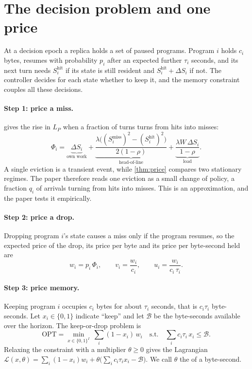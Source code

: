 \section{The decision problem and one price}\label{L5:sec:decision}

At a decision epoch a replica holds a set of paused programs. Program
$i$ holds $c_i$ bytes, resumes with probability $p_i$ after an expected
further $\tau_i$ seconds, and its next turn needs $S_i^{\mathrm{hit}}$ if
its state is still resident and $S_i^{\mathrm{hit}}+\Delta S_i$ if not. The
controller decides for each state whether to keep it, and the memory
constraint couples all these decisions.

\paragraph{Step 1: price a miss.}  gives the rise in $L_P$
when a fraction of turns turns from hits into misses:
\[
  \Phi_i=\underbrace{\Delta S_i}_{\text{own work}}
  +\underbrace{\frac{\lambda\bigl((S_i^{\mathrm{miss}})^2-(S_i^{\mathrm{hit}})^2\bigr)}{2(1-\rho)}}_{\text{head-of-line}}
  +\underbrace{\frac{\lambda W\,\Delta S_i}{1-\rho}}_{\text{load}} .
\]
A single eviction is a transient event, while \cref{thm:price} compares two
stationary regimes. The paper therefore reads one eviction as a small
change of policy, a fraction $q_i$ of arrivals turning from hits into
misses. This is an approximation, and the paper tests it empirically.

\paragraph{Step 2: price a drop.} Dropping program $i$'s state causes a
miss only if the program resumes, so the expected price of the drop, its
price per byte and its price per byte-second held are
\begin{equation}\label{L5:eq:utility}
  w_i=p_i\,\Phi_i,\qquad v_i=\frac{w_i}{c_i},\qquad u_i=\frac{w_i}{c_i\,\tau_i}.
\end{equation}

\paragraph{Step 3: price memory.} Keeping program $i$ occupies $c_i$ bytes
for about $\tau_i$ seconds, that is $c_i\tau_i$ byte-seconds. Let
$x_i\in\{0,1\}$ indicate ``keep'' and let $\mathcal B$ be the byte-seconds available
over the horizon. The keep-or-drop problem is
\begin{equation}\label{L5:eq:primal}
  \mathrm{OPT}=\min_{x\in\{0,1\}^I}\ \sum_i(1-x_i)\,w_i
  \quad\text{s.t.}\quad \sum_i c_i\tau_i\,x_i\le \mathcal B .
\end{equation}
Relaxing the constraint with a multiplier $\theta\ge0$ gives the
Lagrangian
$\mathcal{L}(x,\theta)=\sum_i(1-x_i)w_i+\theta\bigl(\sum_ic_i\tau_ix_i-\mathcal B\bigr)$.
We call $\theta$ the  of a byte-second.

